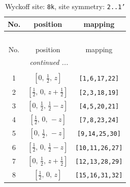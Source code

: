 \documentclass[fleqn,8pt]{jsarticle}
\begin{document}
\renewcommand{\arraystretch}{1.2}
\begin{longtable}{ccc}
\caption{Wyckoff site: {\tt 8k}, site symmetry: {\tt 2..1'}}
 \\
 \hline \hline
No. & position & mapping \\ \hline \endfirsthead

\multicolumn{2}{l}{\tablename\ \thetable{}} \\
 \hline \hline
No. & position & mapping \\ \hline \endhead

 \hline \hline
\multicolumn{2}{r}{\footnotesize\it continued ...} \\ \endfoot

 \hline \hline
\multicolumn{2}{r}{} \\ \endlastfoot

1 & $\left[ 0,\, \frac{1}{2},\, z \right]$ & {\tt [1,6,17,22]} \\ \hline
2 & $\left[ \frac{1}{2},\, 0,\, z + \frac{1}{2} \right]$ & {\tt [2,3,18,19]} \\ \hline
3 & $\left[ 0,\, \frac{1}{2},\, \frac{1}{2} - z \right]$ & {\tt [4,5,20,21]} \\ \hline
4 & $\left[ \frac{1}{2},\, 0,\, - z \right]$ & {\tt [7,8,23,24]} \\ \hline
5 & $\left[ 0,\, \frac{1}{2},\, - z \right]$ & {\tt [9,14,25,30]} \\ \hline
6 & $\left[ \frac{1}{2},\, 0,\, \frac{1}{2} - z \right]$ & {\tt [10,11,26,27]} \\ \hline
7 & $\left[ 0,\, \frac{1}{2},\, z + \frac{1}{2} \right]$ & {\tt [12,13,28,29]} \\ \hline
8 & $\left[ \frac{1}{2},\, 0,\, z \right]$ & {\tt [15,16,31,32]} \\
\end{longtable}
\renewcommand{\arraystretch}{1.2}
\end{document}
